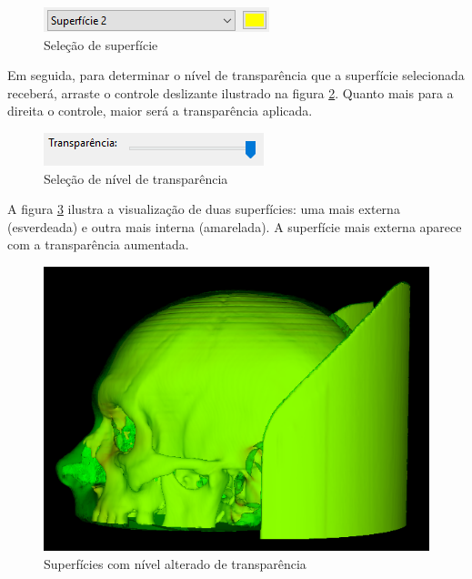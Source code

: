 \begin{figure}[!htb]
\centering
\includegraphics[scale=0.8]{../user_guide_figures/invesalius_screen/surface_select_menu.png}
\caption{Seleção de superfície}
\label{fig:select_surface}
\end{figure}

Em seguida, para determinar o nível de transparência que a superfície selecionada receberá, arraste
o controle deslizante ilustrado na figura \ref{fig:select_transparency}. Quanto mais para a direita
o controle, maior será a transparência aplicada.

\begin{figure}[!htb]
\centering
\includegraphics[scale=0.7]{../user_guide_figures/invesalius_screen/surface_transparency_pt.png}
\caption{Seleção de nível de transparência}
\label{fig:select_transparency}
\end{figure}

A figura \ref{fig:model_transparency} ilustra a visualização de duas superfícies: uma mais externa
(esverdeada) e outra mais interna (amarelada). A superfície mais externa aparece com a transparência
aumentada.

\begin{figure}[!htb]
\centering
\includegraphics[scale=0.3]{../user_guide_figures/invesalius_screen/transparency_2.png}
\caption{Superfícies com nível alterado de transparência}
\label{fig:model_transparency}
\end{figure}


